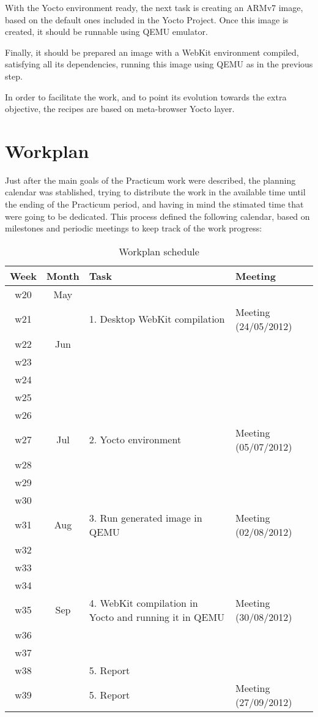 \documentclass[a4paper,11pt,openany]{report}
\begin{document}
With the Yocto environment ready, the next task is creating an ARMv7 image, based on the default ones included in the Yocto Project. Once this image is created, it should be runnable using QEMU emulator.

Finally, it should be prepared an image with a WebKit environment compiled, satisfying all its dependencies, running this image using QEMU as in the previous step.

In order to facilitate the work, and to point its evolution towards the extra objective, the recipes are based on meta-browser Yocto layer.

\section{Workplan}
Just after the main goals of the Practicum work were described, the planning calendar was stablished, trying to distribute the work in the available time until the ending of the Practicum period, and having in mind the stimated time that were going to be dedicated.
This process defined the following calendar, based on milestones and periodic meetings to keep track of the work progress:
\\
\begin{table}
\begin{tabularx}{\textwidth}{|c|c|X|X|}
\hline 
Week & Month & Task & Meeting \\ 
\hline 
w20 & May &  &  \\ 
\hline 
w21 &  & 1. Desktop WebKit compilation & Meeting (24/05/2012) \\ 
\hline 
w22 & Jun &  &  \\ 
\hline 
w23 &  &  &  \\ 
\hline 
w24 &  &  &  \\ 
\hline 
w25 &  &  &  \\ 
\hline 
w26 &  &  &  \\ 
\hline 
w27 & Jul & 2. Yocto environment & Meeting (05/07/2012) \\ 
\hline 
w28 &  &  &  \\ 
\hline 
w29 &  &  &  \\ 
\hline 
w30 &  &  &  \\ 
\hline 
w31 & Aug & 3. Run generated image in QEMU & Meeting (02/08/2012) \\ 
\hline 
w32 &  &  &  \\ 
\hline 
w33 &  &  &  \\ 
\hline 
w34 &  &  &  \\ 
\hline 
w35 & Sep & 4. WebKit compilation in Yocto and running it in QEMU & Meeting (30/08/2012) \\ 
\hline 
w36 &  &  &  \\ 
\hline 
w37 &  &  &  \\ 
\hline 
w38 &  & 5. Report &  \\ 
\hline 
w39 &  & 5. Report & Meeting (27/09/2012) \\ 
\hline 
\end{tabularx}
\caption{Workplan schedule}
\end{table}
\end{document}
